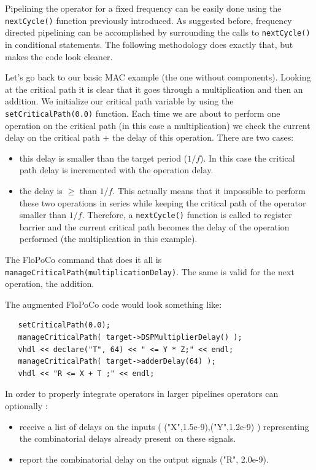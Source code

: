 \documentclass{article}
\begin{document}
Pipelining the operator for a fixed frequency can be easily done using the
\verb!nextCycle()! function previously introduced. As suggested before, frequency
directed pipelining can be accomplished by surrounding the calls to
\verb!nextCycle()! in conditional statements. The following methodology does 
exactly that, but makes the code look cleaner. 

Let's go back to our basic MAC example (the one without components). Looking at
the critical path it is clear that it goes through a multiplication and then an
addition. We initialize our critical path variable by using the
\verb!setCriticalPath(0.0)! function. Each time we are about to perform one 
operation on the critical path (in this case a multiplication) we check 
the current delay on the critical path + the delay of this operation. There are
two cases:
\begin{itemize}
	\item this delay is smaller than the target period ($1/f$). In this case
	the critical path delay is incremented with the operation delay.
	\item the delay is $\ge$ than $1/f$. This actually means that it impossible
	to perform these two operations in series while keeping the critical path
	of the operator smaller than $1/f$. Therefore, a \verb!nextCycle()! function
	is called to register barrier and the current critical path becomes 
	the delay of the operation performed (the multiplication in this example).
\end{itemize}

The FloPoCo command that does it all is \verb!manageCriticalPath(multiplicationDelay)!.
The same is valid for the next operation, the addition.

The augmented FloPoCo code would look something like:

\begin{verbatim}
   setCriticalPath(0.0);
   manageCriticalPath( target->DSPMultiplierDelay() );
   vhdl << declare("T", 64) << " <= Y * Z;" << endl;
   manageCriticalPath( target->adderDelay(64) );
   vhdl << "R <= X + T ;" << endl;
\end{verbatim}


In order to properly integrate operators in larger pipelines operators can optionally :
\begin{itemize}
	\item receive a list of delays on the inputs ( ("X",1.5e-9),("Y",1.2e-9) ) representing
	the combinatorial delays already present on these signals.
	\item report the combinatorial delay on the output signals ("R", 2.0e-9).
\end{itemize}
\end{document}
